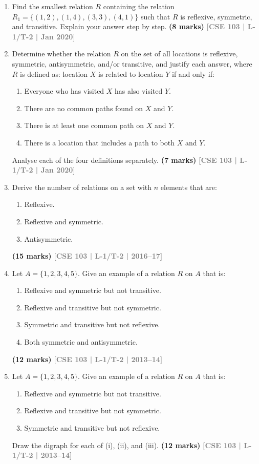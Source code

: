 \documentclass[12pt,a3paper]{article}
\newcommand{\yr}[1]{\hfill\textcolor{gray}{\small\textbf{[#1]}}}
\newcommand{\mk}[1]{\textcolor{orange!70!black}{\small\textbf{(#1 marks)}}}
\begin{document}
\begin{enumerate}
\item Find the smallest relation $R$ containing the relation $R_1 = \{(1,2),(1,4),(3,3),(4,1)\}$ such that $R$ is reflexive, symmetric, and transitive. Explain your answer step by step.
\mk{8} \yr{CSE 103 | L-1/T-2 | Jan 2020}  

\item Determine whether the relation $R$ on the set of all locations is reflexive, symmetric, antisymmetric, and/or transitive, and justify each answer, where $R$ is defined as: location $X$ is related to location $Y$ if and only if:
\begin{enumerate}
  \item Everyone who has visited $X$ has also visited $Y$.
  \item There are no common paths found on $X$ and $Y$.
  \item There is at least one common path on $X$ and $Y$.
  \item There is a location that includes a path to both $X$ and $Y$.
\end{enumerate}
Analyse each of the four definitions separately.
\mk{7} \yr{CSE 103 | L-1/T-2 | Jan 2020}


\item Derive the number of relations on a set with $n$ elements that are:
\begin{enumerate}
  \item Reflexive.
  \item Reflexive and symmetric.
  \item Antisymmetric.
\end{enumerate}
\mk{15} \yr{CSE 103 | L-1/T-2 | 2016--17}  


\item Let $A = \{1, 2, 3, 4, 5\}$. Give an example of a relation $R$ on $A$ that is:
\begin{enumerate}
  \item Reflexive and symmetric but not transitive.
  \item Reflexive and transitive but not symmetric.
  \item Symmetric and transitive but not reflexive.
  \item Both symmetric and antisymmetric.
\end{enumerate}
\mk{12} \yr{CSE 103 | L-1/T-2 | 2013--14}

\item Let $A = \{1, 2, 3, 4, 5\}$. Give an example of a relation $R$ on $A$ that is:
\begin{enumerate}
  \item Reflexive and symmetric but not transitive.
  \item Reflexive and transitive but not symmetric.
  \item Symmetric and transitive but not reflexive.
\end{enumerate}
Draw the digraph for each of (i), (ii), and (iii).
\mk{12} \yr{CSE 103 | L-1/T-2 | 2013--14}


\end{enumerate}
\end{document}
